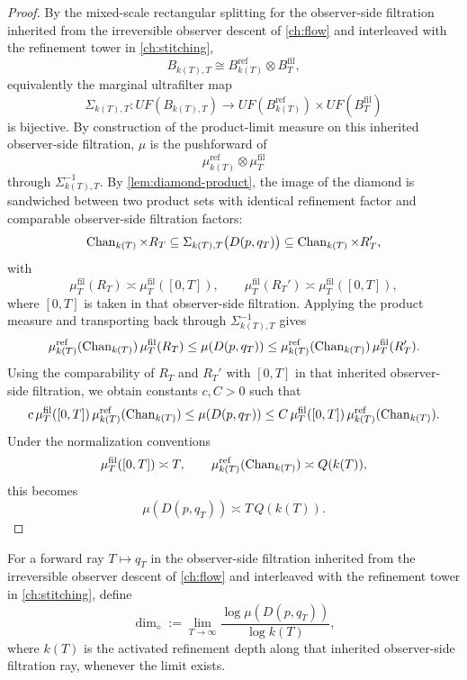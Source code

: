 \begin{proof}
	By the mixed-scale rectangular splitting for the observer-side
	filtration inherited from the irreversible observer descent of
	\cref{ch:flow} and interleaved with the refinement tower in
	\cref{ch:stitching},
	\[
		B_{k(T),T}\cong B_{k(T)}^{\mathrm{ref}}\otimes B_T^{\mathrm{fil}},
	\]
	equivalently the marginal ultrafilter map
	\[
		\Sigma_{k(T),T}:UF(B_{k(T),T})
		\longrightarrow
		UF(B_{k(T)}^{\mathrm{ref}})\times UF(B_T^{\mathrm{fil}})
	\]
	is bijective.
	By construction of the product-limit measure on this inherited
	observer-side filtration, \(\mu\) is the pushforward of
	\[
		\mu_{k(T)}^{\mathrm{ref}}\otimes \mu_T^{\mathrm{fil}}
	\]
	through \(\Sigma_{k(T),T}^{-1}\).
	By \cref{lem:diamond-product}, the image of the diamond is sandwiched
	between two product sets with identical refinement factor and
	comparable observer-side filtration factors:
	\[
		\operatorname{Chan}_{k(T)}\times R_T
		\subseteq
		\Sigma_{k(T),T}\bigl(D(p,q_T)\bigr)
		\subseteq
		\operatorname{Chan}_{k(T)}\times R_T',
	\]
	with
	\[
		\mu_T^{\mathrm{fil}}(R_T)\asymp \mu_T^{\mathrm{fil}}([0,T]),
		\qquad
		\mu_T^{\mathrm{fil}}(R_T')\asymp \mu_T^{\mathrm{fil}}([0,T]),
	\]
	where \([0,T]\) is taken in that observer-side filtration.
	Applying the product measure and transporting back through
	\(\Sigma_{k(T),T}^{-1}\) gives
	\[
		\mu_{k(T)}^{\mathrm{ref}}(\operatorname{Chan}_{k(T)})\,\mu_T^{\mathrm{fil}}(R_T)
		\le
		\mu(D(p,q_T))
		\le
		\mu_{k(T)}^{\mathrm{ref}}(\operatorname{Chan}_{k(T)})\,\mu_T^{\mathrm{fil}}(R_T').
	\]
	Using the comparability of \(R_T\) and \(R_T'\) with \([0,T]\) in
	that inherited observer-side filtration, we obtain constants
	\(c,C>0\) such that
	\[
		c\,\mu_T^{\mathrm{fil}}([0,T])\,
		\mu_{k(T)}^{\mathrm{ref}}(\operatorname{Chan}_{k(T)})
		\le
		\mu(D(p,q_T))
		\le
		C\,\mu_T^{\mathrm{fil}}([0,T])\,
		\mu_{k(T)}^{\mathrm{ref}}(\operatorname{Chan}_{k(T)}).
	\]
	Under the normalization conventions
	\[
		\mu_T^{\mathrm{fil}}([0,T])\asymp T,
		\qquad
		\mu_{k(T)}^{\mathrm{ref}}(\operatorname{Chan}_{k(T)})\asymp Q(k(T)),
	\]
	this becomes
	\[
		\mu(D(p,q_T))\asymp T\,Q(k(T)).
	\]
\end{proof}
\begin{definition}
	For a forward ray \(T\mapsto q_T\) in the observer-side filtration
	inherited from the irreversible observer descent of
	\cref{ch:flow} and interleaved with the refinement tower in
	\cref{ch:stitching}, define
	\[
		\dim_\diamond
		:=
		\lim_{T\to\infty}
		\frac{\log \mu(D(p,q_T))}{\log k(T)},
	\]
	where \(k(T)\) is the activated refinement depth along that
	inherited observer-side filtration ray, whenever the limit exists.
\end{definition}
